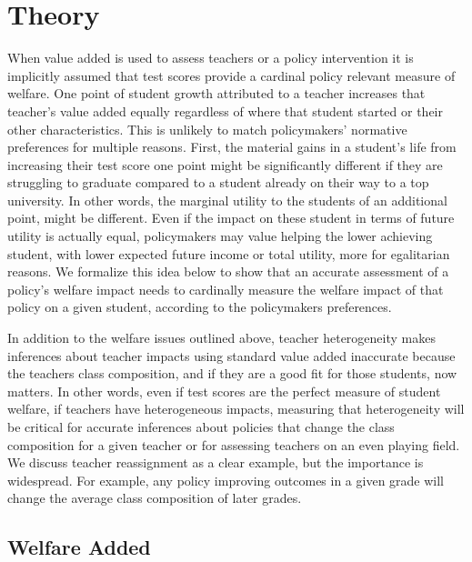 \documentclass[12pt]{article}
\theoremstyle{definition}
\theoremstyle{definition}
\theoremstyle{definition}
\theoremstyle{definition}
\begin{document}
\section{Theory}
\label{theory_setion}
When value added is used to assess teachers or a policy intervention it is implicitly assumed that test scores provide a cardinal policy relevant measure of welfare. One point of student growth attributed to a teacher increases that teacher's value added equally regardless of where that student started or their other characteristics. This is unlikely to match policymakers' normative preferences for multiple reasons. First, the material gains in a student's life from increasing their test score one point might be significantly different if they are struggling to graduate compared to a student already on their way to a top university. In other words, the marginal utility to the students of an additional point, might be different. Even if the impact on these student in terms of future utility is actually equal, policymakers may value helping the lower achieving student, with lower expected future income or total utility, more for egalitarian reasons. We formalize this idea below to show that an accurate assessment of a policy's welfare impact needs to cardinally measure the welfare impact of that policy on a given student, according to the policymakers preferences.

In addition to the welfare issues outlined above, teacher heterogeneity makes inferences about teacher impacts using standard value added inaccurate because the teachers class composition, and if they are a good fit for those students, now matters. In other words, even if test scores are the perfect measure of student welfare, if teachers have heterogeneous impacts, measuring that heterogeneity will be critical for accurate inferences about policies that change the class composition for a given teacher or for assessing teachers on an even playing field. We discuss teacher reassignment as a clear example, but the importance is widespread. For example, any policy improving outcomes in a given grade will change the average class composition of later grades. 
    
    \subsection{Welfare Added }
    
\end{document}
